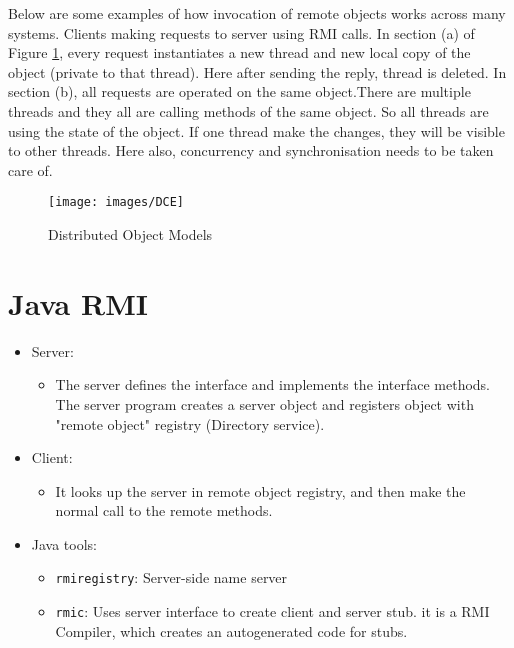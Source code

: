 \documentclass[twoside]{article}
\begin{document}
Below are some examples of how invocation of remote objects works across many systems. Clients making requests to server using RMI calls. In section (a) of Figure \ref{Distributed}, every request instantiates a new thread and new local copy of the object (private to that thread). Here after sending the reply, thread is deleted. In section (b), all requests are operated on the same object.There are multiple threads and they all are calling methods of the same object. So all threads are using the state of the object. If one thread make the changes, they will be visible to other threads. Here also, concurrency and synchronisation needs to be taken care of.
\begin{figure}[h]
\begin{center}
\texttt{[image: images/DCE]}
\caption{Distributed Object Models}
\label{Distributed}
\end{center}
\end{figure}

\section{Java RMI}

\begin{itemize}

	\item Server:
	\begin{itemize}
	\item The server defines the interface and implements the interface methods. The server program creates a server object and registers object with "remote object" registry (Directory service).
	\end{itemize}
	\item Client:
	\begin{itemize}
	\item It looks up the server in remote object registry, and then make the normal call to the remote methods.
	\end{itemize}
	\item Java tools:
		\begin{itemize}
		\item \texttt{rmiregistry}: Server-side name server
		\item \texttt{rmic}: Uses server interface to create client and server stub. it is a RMI Compiler, which creates an autogenerated code for stubs.
		\end{itemize}

\end{itemize}
\end{document}
